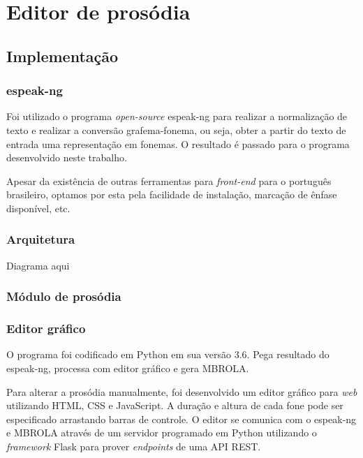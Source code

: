 
\simb[ms (milissegundos)]
\simb[Hz (Hertz)]
\chapter{Editor de prosódia}

\section{Implementação}

\subsection{espeak-ng}
Foi utilizado o programa \emph{open-source} espeak-ng \cite{espeakng} para realizar a normalização de texto e realizar a conversão grafema-fonema, ou seja, obter a partir do texto de entrada uma representação em fonemas. O resultado é passado para o programa desenvolvido neste trabalho.

Apesar da existência de outras ferramentas para \emph{front-end} para o português brasileiro, optamos por esta pela facilidade de instalação, marcação de ênfase disponível, etc.

\subsection{Arquitetura}
Diagrama aqui

\subsection{Módulo de prosódia}

\subsection{Editor gráfico}
O programa foi codificado em Python em sua versão 3.6. Pega resultado do espeak-ng, processa com editor gráfico e gera MBROLA.

Para alterar a prosódia manualmente, foi desenvolvido um editor gráfico
para \emph{web} utilizando HTML, CSS e JavaScript. A duração e altura de cada
fone pode ser especificado arrastando barras de controle. O editor se comunica
com o espeak-ng e MBROLA através de um servidor programado em Python utilizando
o \emph{framework} Flask para prover \emph{endpoints} de uma API REST.

